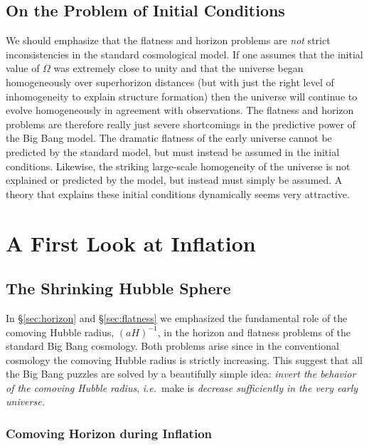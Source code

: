 \documentclass[12pt,letterpaper,rotate]{article}
\begin{document}
{\subsection{On the Problem of Initial Conditions}

We should emphasize that the flatness and horizon problems are {\it not} strict inconsistencies in the standard cosmological model. If one assumes that the initial value of $\Omega$ was extremely close to unity and that the universe began homogeneously over superhorizon distances (but with just the right level of inhomogeneity to explain structure formation) then the universe will continue to evolve homogeneously in agreement with observations. The flatness and horizon problems are therefore really just severe shortcomings in the predictive power of the Big Bang model. The dramatic flatness of the early universe cannot be predicted by the standard model, but must instead be assumed in the initial conditions. Likewise, the striking large-scale homogeneity of the universe is not explained or predicted by the model, but instead must simply be assumed.
A theory that explains these initial conditions dynamically seems very attractive.


\section{A First Look at Inflation}


\subsection{The Shrinking Hubble Sphere}

In \S\ref{sec:horizon} and \S\ref{sec:flatness} we emphasized the fundamental role 
of the comoving Hubble radius, $(a H)^{-1}$, in the horizon and flatness problems of the standard Big Bang cosmology.
Both problems arise since in the conventional cosmology the comoving Hubble radius is strictly increasing.  This suggest that all the Big Bang puzzles are solved by a beautifully simple idea:
{\it invert the behavior of the comoving Hubble radius}, {\it i.e.}~make is {\it decrease sufficiently in the very early universe.}

\subsubsection{Comoving Horizon during Inflation}

}
\end{document}
